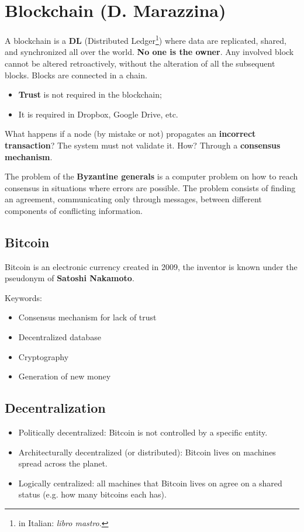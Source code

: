 
\chapter{Blockchain (D. Marazzina)}

A blockchain is a \textbf{DL} (Distributed Ledger\footnote{in Italian: \textit{libro mastro}.}) where data are replicated, shared, and synchronized all over the world. \textbf{No one is the owner}. Any involved block cannot be altered retroactively, without the alteration of all the subsequent blocks. Blocks are connected in a chain.
\begin{itemize}
	\item \textbf{Trust} is not required in the blockchain;
	\item It is required in Dropbox, Google Drive, etc.
\end{itemize}

What happens if a node (by mistake or not) propagates an \textbf{incorrect transaction}? The system must not validate it. How? Through a \textbf{consensus mechanism}.

The problem of the \textbf{Byzantine generals} is a computer problem on how to reach consensus in situations where errors are possible. The problem consists of finding an agreement, communicating only through messages, between different components of conflicting information.


\section{Bitcoin}

Bitcoin is an electronic currency created in 2009, the inventor is known under the pseudonym of \textbf{Satoshi Nakamoto}.

Keywords:
\begin{itemize}
	\item Consensus mechanism for lack of trust
	\item Decentralized database
	\item Cryptography
	\item Generation of new money
\end{itemize}
\section{Decentralization}
\begin{itemize}
	\item Politically decentralized: Bitcoin is not controlled by a specific entity.
	\item Architecturally decentralized (or distributed): Bitcoin lives on machines spread across the planet.
	\item Logically centralized: all machines that Bitcoin lives on agree on a shared status (e.g. how many bitcoins each has).
\end{itemize}

